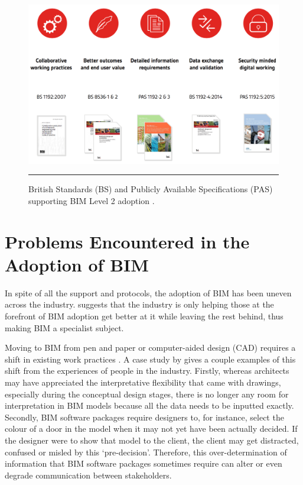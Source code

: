 \begin{figure}[htbp]
	\centering
	\includegraphics[width=\textwidth]{figures/BIMstandards.png}
	\rule{\textwidth}{0.5pt} %
	\caption[BIM Level 2 British Standards and Publicly Available Specifications]{British Standards (BS) and Publicly Available Specifications (PAS) supporting BIM Level 2 adoption \citep{BSI}.}
	\label{stds}
\end{figure}




\section{Problems Encountered in the Adoption of BIM}
In spite of all the support and protocols, the adoption of BIM has been uneven across the industry.
\cite{DesigningBuildingsLtd2017} suggests that the industry is only helping those at the forefront of BIM adoption get better at it while leaving the rest behind, thus making BIM a specialist subject.

Moving to BIM from pen and paper or computer-aided design (CAD) requires a shift in existing work practices \citep{Singh2011}.
A case study by \cite{Neff2010} gives a couple examples of this shift from the experiences of people in the industry.
Firstly, whereas architects may have appreciated the interpretative flexibility that came with drawings, especially during the conceptual design stages, there is no longer any room for interpretation in BIM models because all the data needs to be inputted exactly.
Secondly, BIM software packages require designers to, for instance, select the colour of a door in the model when it may not yet have been actually decided. 
If the designer were to show that model to the client, the client may get distracted, confused or misled by this `pre-decision'.
Therefore, this over-determination of information that BIM software packages sometimes require can alter or even degrade communication between stakeholders.

